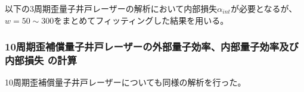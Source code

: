 {

以下の3周期歪量子井戸レーザーの解析において内部損失$\alpha_{int}$が必要となるが、$w=50\sim300$をまとめてフィッティングした結果を用いる。
\clearpage
\subsubsection{10周期歪補償量子井戸レーザーの外部量子効率、内部量子効率及び内部損失
の計算}
10周期歪補償量子井戸レーザーについても同様の解析を行った。

}
